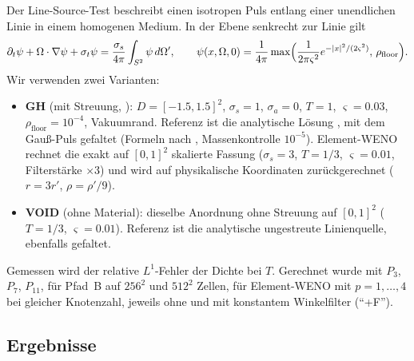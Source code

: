 Der Line-Source-Test \cite{garrett_hauck_2013} beschreibt einen isotropen Puls entlang einer
unendlichen Linie in einem homogenen Medium. In der Ebene senkrecht zur Linie gilt
\[
  \partial_t\psi+\Omega\cdot\nabla\psi+\sigma_t\psi=\frac{\sigma_s}{4\pi}\int_{S^2}\psi\,d\Omega',
  \qquad
  \psi(x,\Omega,0)=\frac{1}{4\pi}\max\Bigl(\frac{1}{2\pi\varsigma^2}e^{-|x|^2/(2\varsigma^2)},\,
  \rho_{\mathrm{floor}}\Bigr).
\]
Wir verwenden zwei Varianten:
\begin{itemize}
  \item \textbf{GH} (mit Streuung, \cite{garrett_hauck_2013}): $D=[-1.5,1.5]^2$, $\sigma_s=1$,
        $\sigma_a=0$, $T=1$, $\varsigma=0.03$, $\rho_{\mathrm{floor}}=10^{-4}$, Vakuumrand.
        Referenz ist die analytische Lösung \cite{ganapol_2008}, mit dem Gauß-Puls gefaltet
        (Formeln nach \cite{bennett_mcclarren_2022}, Massenkontrolle $10^{-5}$).
        Element-WENO rechnet die exakt auf $[0,1]^2$ skalierte Fassung ($\sigma_s=3$, $T=1/3$,
        $\varsigma=0.01$, Filterstärke $\times3$) und wird auf physikalische Koordinaten
        zurückgerechnet ($r=3r'$, $\rho=\rho'/9$).
  \item \textbf{VOID} (ohne Material): dieselbe Anordnung ohne Streuung auf $[0,1]^2$
        ($T=1/3$, $\varsigma=0.01$). Referenz ist die analytische ungestreute Linienquelle,
        ebenfalls gefaltet.
\end{itemize}
Gemessen wird der relative $L^1$-Fehler der Dichte bei $T$. Gerechnet wurde mit $P_3$, $P_7$,
$P_{11}$, für Pfad~B auf $256^2$ und $512^2$ Zellen, für Element-WENO mit $p=1,\dots,4$ bei gleicher
Knotenzahl, jeweils ohne und mit konstantem Winkelfilter (\enquote{+F}).

\subsection{Ergebnisse}

